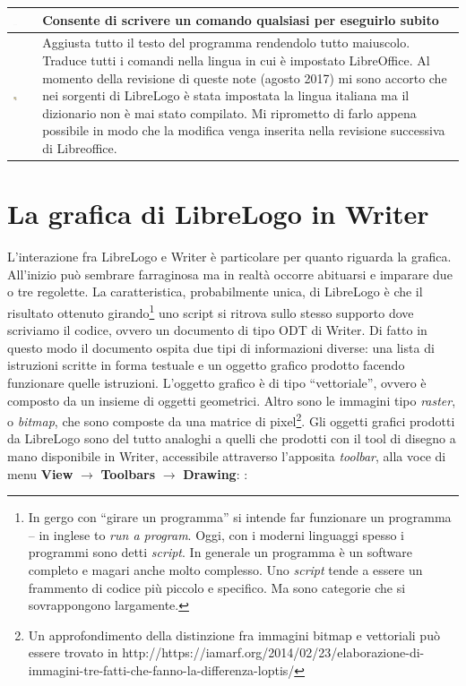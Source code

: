\begin{center}
\begin{tabular}{ c | l | p{5cm} }
    \includegraphics[width=0.75cm]{./images/librelogo/220px-TextLO.png} &  & Consente di scrivere un comando qualsiasi per eseguirlo subito
 \\ \hline
    \includegraphics[width=0.75cm]{./images/librelogo/MagicwLO.png} &  & Aggiusta tutto il testo del programma rendendolo tutto maiuscolo. Traduce tutti i comandi nella lingua in cui è impostato LibreOffice. Al momento della revisione di queste note (agosto 2017) mi sono accorto che nei sorgenti di LibreLogo è stata impostata la lingua italiana ma il dizionario non è mai stato compilato. Mi riprometto di farlo appena possibile in modo che la modifica venga inserita nella revisione successiva di Libreoffice. \\ \hline
    \hline
  \end{tabular}
\end{center}

\section{La grafica di LibreLogo in Writer}

L'interazione fra LibreLogo e Writer è particolare per quanto riguarda la
grafica. All'inizio può sembrare farraginosa ma in realtà occorre abituarsi e
imparare due o tre regolette. La caratteristica, probabilmente unica, di
LibreLogo è che il risultato ottenuto girando\footnote{In gergo con “girare un
programma” si intende far funzionare un programma – in inglese to \textit{run a
program}. Oggi, con i moderni linguaggi spesso i programmi sono detti
\textit{script}. In generale un programma è un software completo e magari anche
molto complesso. Uno \textit{script} tende a essere un frammento di codice più
piccolo e specifico. Ma sono categorie che si sovrappongono largamente.} uno
script si ritrova sullo stesso supporto dove scriviamo il codice, ovvero un documento di tipo ODT di Writer. Di fatto in questo modo il documento ospita due tipi di informazioni diverse: una lista di istruzioni scritte in forma testuale e un oggetto grafico prodotto facendo funzionare quelle istruzioni. L'oggetto grafico è di tipo “vettoriale”, ovvero è composto da un insieme di oggetti geometrici. Altro sono le immagini tipo \textit{raster}, o \textit{bitmap}, che sono composte da una matrice di pixel\footnote{Un approfondimento della distinzione fra immagini bitmap e vettoriali può essere trovato in http://https://iamarf.org/2014/02/23/elaborazione-di-immagini-tre-fatti-che-fanno-la-differenza-loptis/}. Gli oggetti grafici prodotti da LibreLogo sono del tutto analoghi a quelli che prodotti con il tool di disegno a mano disponibile in Writer, accessibile attraverso l'apposita \textit{toolbar}, alla voce di menu \textbf{View} $\rightarrow$ \textbf{Toolbars} $\rightarrow$ \textbf{Drawing}: : 

